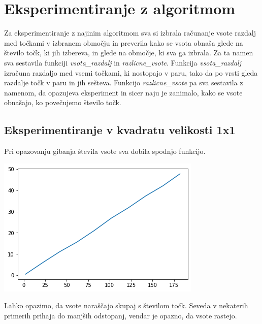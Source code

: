 \documentclass[12pt, a4paper]{article}
\begin{document}
\pagebreak
\section{Eksperimentiranje z algoritmom}
Za eksperimentiranje z najinim algoritmom sva si izbrala računanje vsote razdalj med točkami v izbranem območju in preverila kako se vsota obnaša glede na število točk, ki jih izbereva, in glede na območje, ki sva ga izbrala. Za ta namen sva sestavila funkciji \textit{vsota_razdalj} in \textit{razlicne_vsote}. Funkcija  \textit{vsota_razdalj} izračuna razdaljo med vsemi točkami, ki nostopajo v paru, tako da po vrsti gleda razdalje točk v paru in jih sešteva. Funkcijo \textit{razlicne_vsote} pa sva sestavila z namenom, da opazujeva eksperiment in sicer naju je zanimalo, kako se vsote obnašajo, ko povečujemo število točk. \\
\subsection{Eksperimentiranje v kvadratu velikosti 1x1}
Pri opazovanju gibanja števila vsote sva dobila spodnjo funkcijo.\\
\begin{center}
\includegraphics{kvadrat_1x1.png}
\end{center}
Lahko opazimo, da vsote naraščajo skupaj s številom točk. Seveda v nekaterih primerih prihaja do manjših odstopanj, vendar je opazno, da vsote rastejo.
\end{document}
